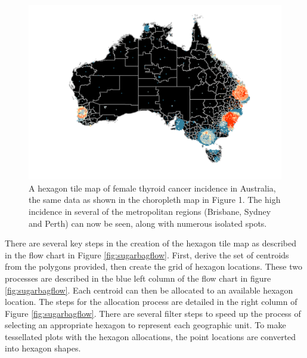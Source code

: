 \begin{Schunk}
\begin{figure}
\includegraphics[width=0.95\linewidth]{kobakian-cook_files/figure-latex/hexmap-1} \caption[A hexagon tile map of female thyroid cancer incidence in Australia, the same data as shown in the choropleth map in Figure 1]{A hexagon tile map of female thyroid cancer incidence in Australia, the same data as shown in the choropleth map in Figure 1. The high incidence in several of the metropolitan regions (Brisbane, Sydney and Perth) can now be seen, along with numerous isolated spots.}\label{fig:hexmap}
\end{figure}
\end{Schunk}

There are several key steps in the creation of the hexagon tile map as
described in the flow chart in Figure \ref{fig:sugarbagflow}. First,
derive the set of centroids from the polygons provided, then create the
grid of hexagon locations. These two processes are described in the blue
left column of the flow chart in figure \ref{fig:sugarbagflow}. Each
centroid can then be allocated to an available hexagon location. The
steps for the allocation process are detailed in the right column of
Figure \ref{fig:sugarbagflow}. There are several filter steps to speed
up the process of selecting an appropriate hexagon to represent each
geographic unit. To make tessellated plots with the hexagon allocations,
the point locations are converted into hexagon shapes.


